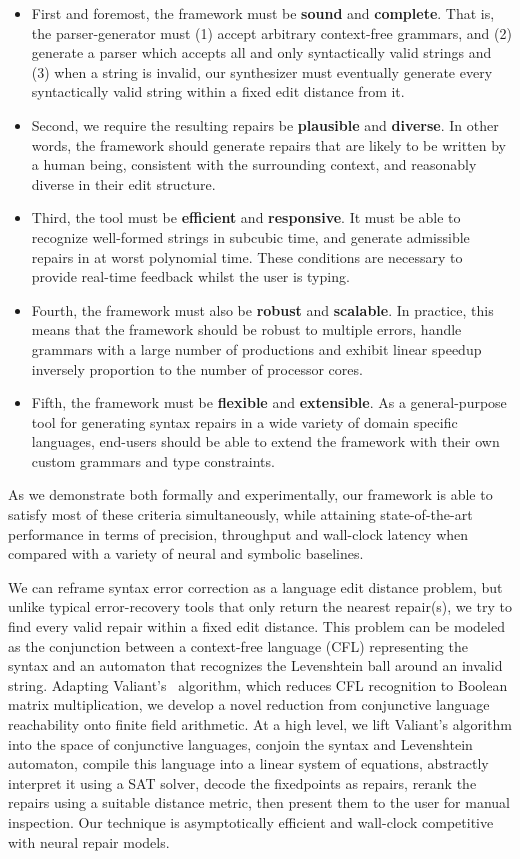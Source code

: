 \documentclass[sigplan,screen]{acmart}
\begin{document}
\begin{itemize}
  \item First and foremost, the framework must be \textbf{sound} and \textbf{complete}. That is, the parser-generator must (1) accept arbitrary context-free grammars, and (2) generate a parser which accepts all and only syntactically valid strings and (3) when a string is invalid, our synthesizer must eventually generate every syntactically valid string within a fixed edit distance from it.
  \item Second, we require the resulting repairs be \textbf{plausible} and \textbf{diverse}. In other words, the framework should generate repairs that are likely to be written by a human being, consistent with the surrounding context, and reasonably diverse in their edit structure.
  \item Third, the tool must be \textbf{efficient} and \textbf{responsive}. It must be able to recognize well-formed strings in subcubic time, and generate admissible repairs in at worst polynomial time. These conditions are necessary to provide real-time feedback whilst the user is typing.
  \item Fourth, the framework must also be \textbf{robust} and \textbf{scalable}. In practice, this means that the framework should be robust to multiple errors, handle grammars with a large number of productions and exhibit linear speedup inversely proportion to the number of processor cores.
  \item Fifth, the framework must be \textbf{flexible} and \textbf{extensible}. As a general-purpose tool for generating syntax repairs in a wide variety of domain specific languages, end-users should be able to extend the framework with their own custom grammars and type constraints.
\end{itemize}

As we demonstrate both formally and experimentally, our framework is able to satisfy most of these criteria simultaneously, while attaining state-of-the-art performance in terms of precision, throughput and wall-clock latency when compared with a variety of neural and symbolic baselines.

We can reframe syntax error correction as a language edit distance problem, but unlike typical error-recovery tools that only return the nearest repair(s), we try to find every valid repair within a fixed edit distance. This problem can be modeled as the conjunction between a context-free language (CFL) representing the syntax and an automaton that recognizes the Levenshtein ball around an invalid string. Adapting Valiant's~\cite{valiant1975general} algorithm, which reduces CFL recognition to Boolean matrix multiplication, we develop a novel reduction from conjunctive language reachability onto finite field arithmetic. At a high level, we lift Valiant's algorithm into the space of conjunctive languages, conjoin the syntax and Levenshtein automaton, compile this language into a linear system of equations, abstractly interpret it using a SAT solver, decode the fixedpoints as repairs, rerank the repairs using a suitable distance metric, then present them to the user for manual inspection. Our technique is asymptotically efficient and wall-clock competitive with neural repair models.
\end{document}
